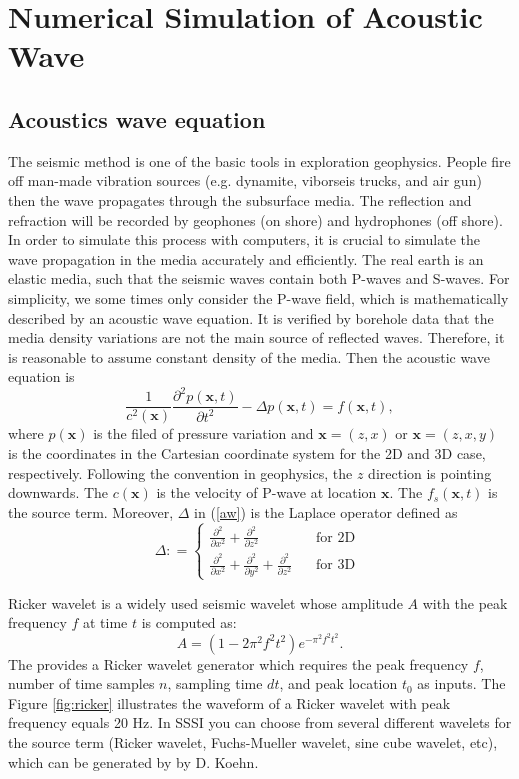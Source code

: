 \documentclass[11pt]{article}
\newcommand{\bx}{\boldsymbol{x}}
\theoremstyle{plain}
\theoremstyle{definition}
\theoremstyle{remark}
\numberwithin{equation}{section}
\begin{document}
\section{Numerical Simulation of Acoustic Wave}
\subsection{Acoustics wave equation}
The seismic method is one of the basic tools in exploration geophysics. People fire off man-made vibration sources (e.g. dynamite, viborseis trucks, and air gun) then the wave propagates through the subsurface media. The reflection and refraction will be recorded by geophones (on shore) and hydrophones (off shore). In order to simulate this process with computers, it is crucial to simulate the wave propagation in the media
accurately and efficiently. The real earth is an elastic media, such that the seismic waves contain both P-waves and S-waves. For simplicity, we some times only consider the P-wave field, which is mathematically described by an acoustic wave equation. It is verified by borehole data that the media density variations are not the main source of reflected waves. Therefore, it is reasonable to assume constant density of the media. Then the acoustic wave equation is  
\begin{equation}\label{aw}
\frac{1}{c^2(\bx)}\frac{\partial^2 p(\bx,t)}{\partial t^2}-\Delta p(\bx,t)=f(\bx,t),
\end{equation}
where $p(\bx)$ is the filed of pressure variation and $\bx=(z,x)$ or $\bx=(z,x,y)$ is the coordinates in the Cartesian coordinate system for the 2D and 3D case, respectively. Following the convention in geophysics, the $z$ direction is pointing downwards. The $c(\bx)$ is the velocity of P-wave at location $\bx$. The $f_s(\bx,t)$ is the source term. Moreover, $\Delta$ in (\ref{aw}) is the Laplace operator defined as 
\begin{equation}
\Delta: =\left\{
\begin{aligned}
\frac{\partial^2}{\partial x^2}+\frac{\partial^2}{\partial z^2}~~~~~~~ & ~~~~\text{for 2D }\\
\frac{\partial^2}{\partial x^2}+\frac{\partial^2}{\partial y^2}+\frac{\partial^2}{\partial z^2} &~~~~ \text{for 3D}
\end{aligned}
\right.  
\end{equation}

Ricker wavelet is a widely used seismic wavelet whose amplitude $A$ with the peak frequency $f$ at time $t$ is computed 
as:
\begin{equation}
A=(1-2\pi^2 f^2 t^2)e^{-\pi^2 f^2 t^2}.
\end{equation}
The  provides a Ricker wavelet generator which requires the peak frequency $f$, number of time samples $n$, 
sampling time $dt$, and peak location $t_0$ as inputs. The Figure \ref{fig:ricker} illustrates the waveform of a Ricker wavelet with peak frequency equals 20 Hz. In SSSI you can choose from several different wavelets for the source term (Ricker wavelet, Fuchs-Mueller wavelet, sine cube wavelet, etc), which can be generated by  by D. Koehn.
\end{document}
